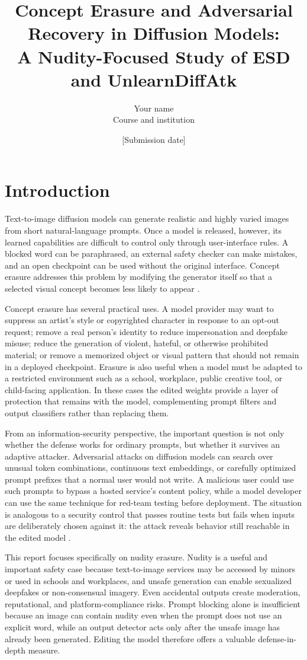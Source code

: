 \documentclass[11pt,a4paper]{article}
\title{Concept Erasure and Adversarial Recovery in Diffusion Models:\\A Nudity-Focused Study of ESD and UnlearnDiffAtk}
\author{Your name \\ Course and institution}
\date{[Submission date]}
\begin{document}
\maketitle

\section{Introduction}
Text-to-image diffusion models can generate realistic and highly varied images from short natural-language prompts. Once a model is released, however, its learned capabilities are difficult to control only through user-interface rules. A blocked word can be paraphrased, an external safety checker can make mistakes, and an open checkpoint can be used without the original interface. Concept erasure addresses this problem by modifying the generator itself so that a selected visual concept becomes less likely to appear \cite{esd}.

Concept erasure has several practical uses. A model provider may want to suppress an artist's style or copyrighted character in response to an opt-out request; remove a real person's identity to reduce impersonation and deepfake misuse; reduce the generation of violent, hateful, or otherwise prohibited material; or remove a memorized object or visual pattern that should not remain in a deployed checkpoint. Erasure is also useful when a model must be adapted to a restricted environment such as a school, workplace, public creative tool, or child-facing application. In these cases the edited weights provide a layer of protection that remains with the model, complementing prompt filters and output classifiers rather than replacing them.

From an information-security perspective, the important question is not only whether the defense works for ordinary prompts, but whether it survives an adaptive attacker. Adversarial attacks on diffusion models can search over unusual token combinations, continuous text embeddings, or carefully optimized prompt prefixes that a normal user would not write. A malicious user could use such prompts to bypass a hosted service's content policy, while a model developer can use the same technique for red-team testing before deployment. The situation is analogous to a security control that passes routine tests but fails when inputs are deliberately chosen against it: the attack reveals behavior still reachable in the edited model \cite{unlearndiffatk}.

This report focuses specifically on nudity erasure. Nudity is a useful and important safety case because text-to-image services may be accessed by minors or used in schools and workplaces, and unsafe generation can enable sexualized deepfakes or non-consensual imagery. Even accidental outputs create moderation, reputational, and platform-compliance risks. Prompt blocking alone is insufficient because an image can contain nudity even when the prompt does not use an explicit word, while an output detector acts only after the unsafe image has already been generated. Editing the model therefore offers a valuable defense-in-depth measure.
\end{document}
